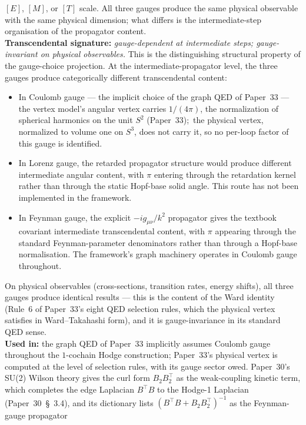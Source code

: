 \documentclass[11pt]{article}
\begin{document}
$[E]$, $[M]$, or $[T]$ scale.  All three gauges produce the same
physical observable with the same physical dimension; what differs is
the intermediate-step organisation of the propagator content.\\
\textbf{Transcendental signature:} \emph{gauge-dependent at
intermediate steps; gauge-invariant on physical observables.}  This is
the distinguishing structural property of the gauge-choice projection.
At the intermediate-propagator level, the three gauges produce
categorically different transcendental content:
\begin{itemize}\setlength{\itemsep}{2pt}
\item In Coulomb gauge --- the implicit choice of the graph QED of
Paper~33 --- the vertex model's angular vertex carries
$1/(4\pi)$, the normalization of spherical harmonics on the unit
$S^2$ (Paper~33);\ the physical vertex, normalized to volume one on
$S^3$, does not carry it, so no per-loop factor of this gauge is
identified.
\item In Lorenz gauge, the retarded propagator structure would produce
different intermediate angular content, with $\pi$ entering through
the retardation kernel rather than through the static Hopf-base solid
angle.  This route has not been implemented in the framework.
\item In Feynman gauge, the explicit $-i g_{\mu\nu}/k^2$ propagator
gives the textbook covariant intermediate transcendental content, with
$\pi$ appearing through the standard Feynman-parameter denominators
rather than through a Hopf-base normalisation.  The framework's
graph machinery operates in Coulomb gauge throughout.
\end{itemize}
On physical observables (cross-sections, transition rates, energy
shifts), all three gauges produce identical results --- this is the
content of the Ward identity (Rule~6 of Paper~33's eight QED selection
rules, which the physical vertex satisfies in Ward--Takahashi form), and it is
gauge-invariance in its standard QED sense.\\
\textbf{Used in:} the graph QED of Paper~33
implicitly assumes Coulomb gauge throughout the $1$-cochain Hodge
construction; Paper~33's physical vertex is computed at the level of
selection rules, with its gauge sector owed.  Paper~30's SU(2) Wilson theory gives the
curl form $B_2 B_2^\top$ as the weak-coupling kinetic term, which
completes the edge Laplacian $B^\top B$ to the Hodge-1 Laplacian
(Paper~30~\S~3.4), and its dictionary lists
$(B^\top B + B_2 B_2^\top)^{-1}$ as the Feynman-gauge propagator
\end{document}
